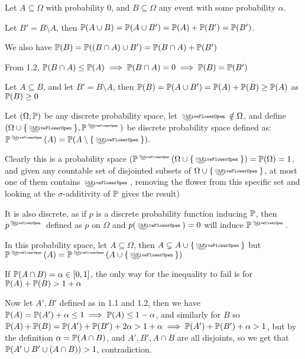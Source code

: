 \maketitle
\begin{cExercise}
	\begin{cPart}
		
		Let $A\subseteq \Omega$ with probability $0$, and $B\subseteq \Omega$ any event with some probability $\alpha$.
		
		Let $B'=B\setminus A$, then $\P(A\cup B)=\P(A\cup B')=\P(A)+\P(B')=\P(B')$.
		
		We also have $\P(B)=\P((B\cap A)\cup B')=\P(B\cap A)+\P(B')$
		
		From 1.2, $\P(B\cap A)\le\P(A)\implies \P(B\cap A)=0\implies \P(B)=\P(B')$
		
	\end{cPart}
	\begin{cPart}
		Let $A\subseteq B$, and let $B'=B\setminus A$, then $\P(B)=\P(A\cup B')=\P(A)+\P(B)\ge \P(A)$ as $\P(B)\ge 0$
		
	\end{cPart}
	\begin{cPart}
		Let $(\Omega, \P)$ be any discrete probability space, let $\flower\notin \Omega$, and define $(\Omega\cup\{\flower\}, \P^{\flower})$ be discrete probability space defined as: $\P^{\flower}(A)=\P(A\setminus\{\flower\})$.
		
		Clearly this is a probability space ($\P^{\flower}(\Omega\cup\{\flower\})=\P(\Omega)=1$, and given any countable set of disjointed subsets of $\Omega\cup\{\flower\}$, at most one of them contains $\flower$, removing the flower from this specific set and looking at the $\sigma$-additivity of $\P$ gives the result)
		
		It is also discrete, as if $p$ is a discrete probability function inducing $\P$, then $p^{\flower}$ defined as $p$ on $\Omega$ and $p(\flower)=0$ will induce $\P^{\flower}$.
		
		In this probability space, let $A\subseteq\Omega$, then $A\subsetneq A\cup\{\flower\}$ but $\P^{\flower}(A)=\P^{\flower}(A\cup\{\flower\})$
	\end{cPart}
	\begin{cPart}
		If $\P(A\cap B)=\alpha\in[0,1]$, the only way for the inequality to fail is for $\P(A)+\P(B)>1+\alpha$
		
		Now let $A',B'$ defined as in 1.1 and 1.2, then we have $\P(A)=\P(A')+\alpha\le 1\implies \P(A)\le 1-\alpha$, and similarly for $B$ so $\P(A)+\P(B)=\P(A')+\P(B')+2\alpha>1+\alpha\implies \P(A')+\P(B')+\alpha>1$, but by the definition $\alpha=\P(A\cap B)$, and $A',B',A\cap B$ are all disjoints, so we get that $\P(A'\cup B'\cup (A\cap B))>1$, contradiction.
		

\end{cPart}
\end{cExercise}
